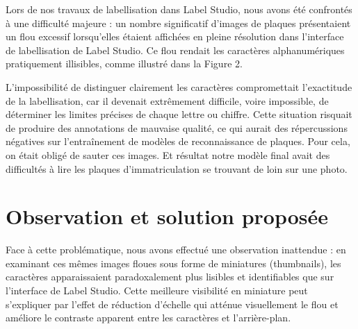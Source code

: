 \documentclass[twocolumn]{el-author}
\begin{document}
Lors de nos travaux de labellisation dans Label Studio, nous avons été confrontés à une difficulté majeure : un nombre significatif d'images de plaques présentaient un flou excessif lorsqu'elles étaient affichées en pleine résolution dans l'interface de labellisation de Label Studio. Ce flou rendait les caractères alphanumériques pratiquement illisibles, comme illustré dans la Figure 2.

L'impossibilité de distinguer clairement les caractères compromettait l'exactitude de la labellisation, car il devenait extrêmement difficile, voire impossible, de déterminer les limites précises de chaque lettre ou chiffre. Cette situation risquait de produire des annotations de mauvaise qualité, ce qui aurait des répercussions négatives sur l'entraînement de modèles de reconnaissance de plaques.
Pour cela, on était obligé de sauter ces images. Et résultat notre modèle final avait des difficultés à lire les plaques d'immatriculation se trouvant de loin sur une photo.


\section{Observation et solution proposée}

Face à cette problématique, nous avons effectué une observation inattendue : en examinant ces mêmes images floues sous forme de miniatures (thumbnails), les caractères apparaissaient paradoxalement plus lisibles et identifiables que sur l'interface de Label Studio. Cette meilleure visibilité en miniature peut s'expliquer par l'effet de réduction d'échelle qui atténue visuellement le flou et améliore le contraste apparent entre les caractères et l'arrière-plan.

\end{document}
